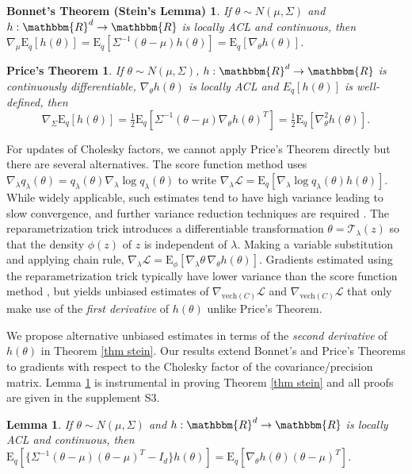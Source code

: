 \documentclass{statsoc}
\newtheorem{lemma}{Lemma}
\newtheorem{thma}{Bonnet's Theorem (Stein's Lemma)}
\newtheorem{thmb}{Price's Theorem}
\newcommand\E{{\text{E}}}
\newcommand\mL{{\mathcal{L}}}
\newcommand{\vech}{\text{vech}}
\begin{document}
\begin{thma} If $\theta \sim N(\mu, \Sigma)$ and $h: \mathbbm{R}^d \rightarrow \mathbbm{R}$ is locally ACL and continuous, then $\nabla_\mu  \E_q [h(\theta)]  = \E_q \left[\Sigma^{-1} (\theta-\mu) h(\theta) \right] =  \E_q[\nabla_\theta h(\theta)]$.
\end{thma}

\begin{thmb}
If $\theta \sim N(\mu, \Sigma)$, $h: \mathbbm{R}^d \rightarrow \mathbbm{R}$ is continuously differentiable, $\nabla_\theta h(\theta)$ is locally ACL and $E_q[h(\theta)]$ is well-defined, then
\[
\nabla_\Sigma  \E_q [h(\theta)] = \tfrac{1}{2} \E_q \left[\Sigma^{-1}  (\theta-\mu) \nabla_\theta h(\theta)^T \right] = \tfrac{1}{2} \E_q \left [\nabla_\theta^2 h(\theta) \right].
\]
\end{thmb}


For updates of Cholesky factors, we cannot apply Price's Theorem directly but there are several alternatives. The score function method uses $ \nabla_\lambda q_\lambda (\theta) = q_\lambda (\theta) \nabla_\lambda \log q_\lambda (\theta)$ to write $\nabla_\lambda \mL =  \E_q[\nabla_\lambda \log q_\lambda (\theta) h(\theta)]$. While widely applicable, such estimates tend to have high variance leading to slow convergence, and further variance reduction techniques are required \citep{Paisley2012, Ranganath2014, Ruiz2016b}. The reparametrization trick \citep{Kingma2014} introduces a differentiable transformation $\theta = \mathcal{T}_\lambda(z)$ so that the density $\phi(z)$ of $z$ is independent of $\lambda$. Making a variable substitution and applying chain rule,
$\nabla_\lambda \mL = \E_{\phi} [\nabla_\lambda \theta \,\nabla_\theta h(\theta)]$. Gradients estimated using the reparametrization trick typically have lower variance than the score function method \citep{Xu2019}, but yields unbiased estimates of $\nabla_{\vech(C)} \mL$ and $\nabla_{\vech(C)} \mL$ that only make use of the {\em first derivative} of $h(\theta)$ unlike Price's Theorem. 

We propose alternative unbiased estimates in terms of the {\em second derivative} of $h(\theta)$ in Theorem \ref{thm stein}. Our results extend  Bonnet's and Price's Theorems to gradients with respect to the Cholesky factor of the covariance/precision matrix. Lemma \ref{lem stein} is instrumental in proving Theorem \ref{thm stein} and all proofs are given in the supplement S3. 

\begin{lemma} \label{lem stein}
 If $\theta \sim N(\mu, \Sigma)$ and $h: \mathbbm{R}^d \rightarrow \mathbbm{R}$ is locally ACL and continuous, then $\E_q \left[ \{\Sigma^{-1} (\theta-\mu)  (\theta - \mu) ^T  - I_d \}  h(\theta)\right] =  \E_q \left[ \nabla_\theta h(\theta)(\theta - \mu) ^T \right] $.
\end{lemma}
\end{document}
